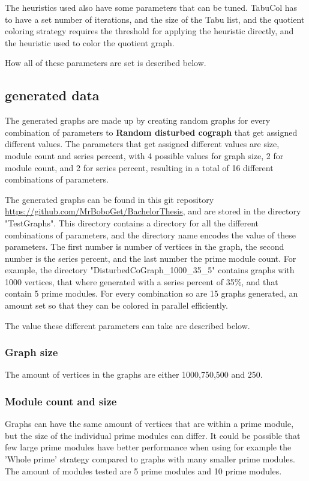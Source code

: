\documentclass[a4paper]{article}
\begin{document}
The heuristics used also have some parameters that can be tuned. TabuCol has to
have a set number of iterations, and the size of the Tabu list, and the quotient
coloring strategy requires the threshold for applying the heuristic directly,
and the heuristic used to color the quotient graph.


How all of these parameters are set is described below.

\subsection{generated data}

The generated graphs are made up by creating random graphs for every
combination of parameters to \textbf{Random disturbed cograph} that get assigned
different values. The parameters that get assigned different values are size,
module count and series percent, with 4 possible values for graph size, 2 for
module count, and 2 for series percent, resulting in a total of 16 different
combinations of parameters.

The generated graphs can be found in this git repository
\url{https://github.com/MrBoboGet/BachelorThesis}, and are stored in the
directory "TestGraphs". This directory contains a directory for all the different
combinations of parameters, and the directory name encodes the value of these
parameters. The first number is number of vertices in the graph, the second
number is the series percent, and the last number the prime module count.
For example, the directory "DisturbedCoGraph\_1000\_35\_5" contains graphs with 
1000 vertices, that where generated with a series percent of 35\%, and that
contain 5 prime modules. For every combination so are 15 graphs generated, 
an amount set so that they can be colored in parallel efficiently.

The value these different parameters can take are described below.
\subsubsection{Graph size}

The amount of vertices in the graphs are either 1000,750,500 and 250.

\subsubsection{Module count and size}

Graphs can have the same amount of vertices that are within a prime module,
but the size of the individual prime modules can differ. It could be possible that
few large prime modules have better performance when using for example the
'Whole prime' strategy compared to graphs with many smaller prime modules.
The amount of modules tested are 5 prime modules and 10 prime modules.
\end{document}
